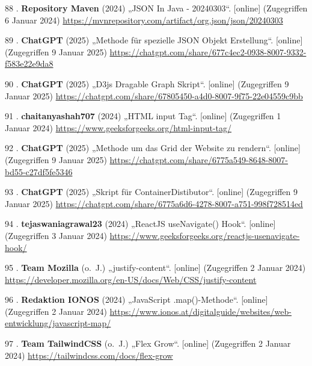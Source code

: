 \documentclass[
    headings=optiontotocandhead,%
    twoside,
    numbers=noenddot,%
    12pt, %
    titlepage, %
    parskip=full, %
    listof=leveldown, 
    numbers=noenddot, %
    a4paper,DIV=14,
    BCOR=15mm,
]{scrbook}
\newlength{\cslhangindent}
\newenvironment{cslreferences}%
  {\setlength{\parindent}{0pt}%
  \everypar{\setlength{\hangindent}{\cslhangindent}}\ignorespaces}%
  {\par}
\begin{document}
\begin{cslreferences}
\leavevmode\hypertarget{ref-MavenRepository-JSON}{}%
88 . \textbf{Repository Maven} (2024) „JSON In Java - 20240303``.
{[}online{]} (Zugegriffen 6 Januar 2024)
\url{https://mvnrepository.com/artifact/org.json/json/20240303}

\leavevmode\hypertarget{ref-gpt-SpecificJson}{}%
89 . \textbf{ChatGPT} (2025) „Methode für spezielle JSON Objekt
Erstellung``. {[}online{]} (Zugegriffen 9 Januar 2025)
\url{https://chatgpt.com/share/677c4ec2-0938-8007-9332-f583e22e9da8}

\leavevmode\hypertarget{ref-gpt-D3jsDGScript}{}%
90 . \textbf{ChatGPT} (2025) „D3js Dragable Graph Skript``. {[}online{]}
(Zugegriffen 9 Januar 2025)
\url{https://chatgpt.com/share/67805450-a4d0-8007-9f75-22e04559c9bb}

\leavevmode\hypertarget{ref-GeeksForGeeks-HTMLInputTag}{}%
91 . \textbf{chaitanyashah707} (2024) „HTML input Tag``. {[}online{]}
(Zugegriffen 1 Januar 2024)
\url{https://www.geeksforgeeks.org/html-input-tag/}

\leavevmode\hypertarget{ref-gpt-renderGrid}{}%
92 . \textbf{ChatGPT} (2025) „Methode um das Grid der Website zu
rendern``. {[}online{]} (Zugegriffen 9 Januar 2025)
\url{https://chatgpt.com/share/6775a549-8648-8007-bd55-c27df5fe5346}

\leavevmode\hypertarget{ref-gpt-ContainerDistributorScript}{}%
93 . \textbf{ChatGPT} (2025) „Skript für ContainerDistibutor``.
{[}online{]} (Zugegriffen 9 Januar 2025)
\url{https://chatgpt.com/share/6775a6d6-4278-8007-a751-998f728514ed}

\leavevmode\hypertarget{ref-GeeksForGeeks-useNavigate}{}%
94 . \textbf{tejaswaniagrawal23} (2024) „ReactJS useNavigate() Hook``.
{[}online{]} (Zugegriffen 3 Januar 2024)
\url{https://www.geeksforgeeks.org/reactjs-usenavigate-hook/}

\leavevmode\hypertarget{ref-DeveloperMozilla-JustifyContent}{}%
95 . \textbf{Team Mozilla} (o.~J.) „justify-content``. {[}online{]}
(Zugegriffen 2 Januar 2024)
\url{https://developer.mozilla.org/en-US/docs/Web/CSS/justify-content}

\leavevmode\hypertarget{ref-Ionos-JS-map}{}%
96 . \textbf{Redaktion IONOS} (2024) „JavaScript .map()-Methode``.
{[}online{]} (Zugegriffen 2 Januar 2024)
\url{https://www.ionos.at/digitalguide/websites/web-entwicklung/javascript-map/}

\leavevmode\hypertarget{ref-TailwindCSS-Docs-FlexGrow}{}%
97 . \textbf{Team TailwindCSS} (o.~J.) „Flex Grow``. {[}online{]}
(Zugegriffen 2 Januar 2024) \url{https://tailwindcss.com/docs/flex-grow}


\end{cslreferences}
\end{document}
